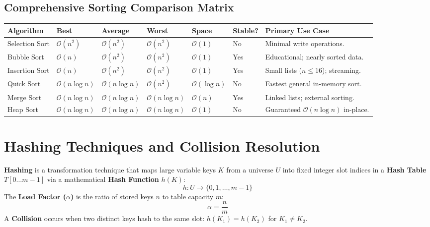 \documentclass[12pt,a4paper]{article}
\renewcommand{\arraystretch}{1.45}
\begin{document}
\subsection{Comprehensive Sorting Comparison Matrix}
\par\vspace{6pt}\noindent
\begingroup
\setlength{\tabcolsep}{3.5pt}
\setlength{\extrarowheight}{2.5pt}
\renewcommand{\arraystretch}{1.25}
\begin{tabularx}{\linewidth}{|B{2.2cm}|B{1.8cm}|B{1.8cm}|B{1.8cm}|B{1.3cm}|B{1.3cm}|Y|}
\hline
\textbf{Algorithm} & \textbf{Best} & \textbf{Average} & \textbf{Worst} & \textbf{Space} & \textbf{Stable?} & \textbf{Primary Use Case} \\
\hline
Selection Sort & $\mathcal{O}(n^2)$ & $\mathcal{O}(n^2)$ & $\mathcal{O}(n^2)$ & $\mathcal{O}(1)$ & No & Minimal write operations. \\
\hline
Bubble Sort & $\mathcal{O}(n)$ & $\mathcal{O}(n^2)$ & $\mathcal{O}(n^2)$ & $\mathcal{O}(1)$ & Yes & Educational; nearly sorted data. \\
\hline
Insertion Sort & $\mathcal{O}(n)$ & $\mathcal{O}(n^2)$ & $\mathcal{O}(n^2)$ & $\mathcal{O}(1)$ & Yes & Small lists ($n \le 16$); streaming. \\
\hline
Quick Sort & $\mathcal{O}(n \log n)$ & $\mathcal{O}(n \log n)$ & $\mathcal{O}(n^2)$ & $\mathcal{O}(\log n)$ & No & Fastest general in-memory sort. \\
\hline
Merge Sort & $\mathcal{O}(n \log n)$ & $\mathcal{O}(n \log n)$ & $\mathcal{O}(n \log n)$ & $\mathcal{O}(n)$ & Yes & Linked lists; external sorting. \\
\hline
Heap Sort & $\mathcal{O}(n \log n)$ & $\mathcal{O}(n \log n)$ & $\mathcal{O}(n \log n)$ & $\mathcal{O}(1)$ & No & Guaranteed $\mathcal{O}(n \log n)$ in-place. \\
\hline
\end{tabularx}
\endgroup

\section{Hashing Techniques and Collision Resolution}

\begin{tcolorbox}[defbox, title={\textbf{Definition: Hashing, Hash Table and Load Factor}}]
\textbf{Hashing} is a transformation technique that maps large variable keys $K$ from a universe $U$ into fixed integer slot indices in a \textbf{Hash Table} $T[0 \dots m-1]$ via a mathematical \textbf{Hash Function} $h(K)$:
\begin{equation}
  h : U \longrightarrow \{0, 1, \dots, m - 1\}
\end{equation}
The \textbf{Load Factor ($\alpha$)} is the ratio of stored keys $n$ to table capacity $m$:
\begin{equation}
  \alpha = \frac{n}{m}
\end{equation}
A \textbf{Collision} occurs when two distinct keys hash to the same slot: $h(K_1) = h(K_2)$ for $K_1 \ne K_2$.
\end{tcolorbox}
\end{document}
